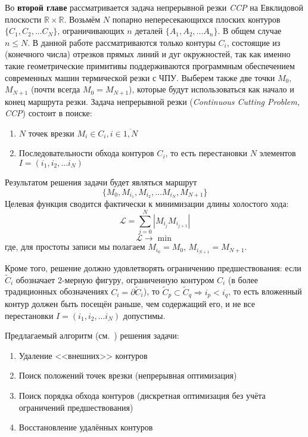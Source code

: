 
Во {\bf второй главе} 
рассматривается задача непрерывной резки {\it CCP}
на Евклидовой плоскости
$\mathbb R \times \mathbb R$.
Возьмём
$N$
попарно непересекающихся плоских контуров
$\{C_1, C_2, ... C_N\}$,
ограничивающих
$n$
деталей
$\{A_1, A_2, ... A_n\}$.
В общем случае
$n \leqslant N$.
В данной работе рассматриваются только контуры 
$C_i$,
состоящие из
(конечного числа)
отрезков прямых линий и дуг окружностей,
так как именно такие геометрические примитивы
поддерживаются программным обеспечением
современных машин термической резки с ЧПУ.
Выберем также две точки 
$M_0$, $M_{N + 1}$
(почти всегда $M_0 = M_{N + 1}$),
которые будут использоваться
как начало и конец
маршрута резки.
Задача непрерывной резки
({\it Continuous Cutting Problem, CCP})
состоит в поиске:
\begin{enumerate}
\item
$N$ точек врезки $M_i \in C_i, i \in \overline{1, N}$
\item
Последовательности обхода контуров
$C_i$,
то есть перестановки
$N$
элементов
$I = (i_1, i_2, ... i_N)$
\end{enumerate}
Результатом решения задачи будет являться маршрут
\begin{equation}
  \label{eq:route}
  \{M_0, M_{i_1}, M_{i_2}, \dots M_{i_N}, M_{N + 1}\}
\end{equation}
Целевая функция
сводится фактически к минимизации длины холостого хода:
\begin{equation}
  \mathcal{L} = \sum_{j=0}^N|M_{i_j}M_{i_{j+1}}|
  \label{air-move-length}
\end{equation}
$$
\mathcal{L} \to \min
$$
где, для простоты записи мы полагаем
$M_{i_0} = M_0$,
$M_{i_{N + 1}} = M_{N + 1}$.

Кроме того, решение должно удовлетворять ограничению предшествования:
если
$\widetilde C_i$
обозначает 2-мерную фигуру,
ограниченную контуром
$C_i$
(в более традиционных обозначениях
$C_i = \partial \widetilde C_i$),
то 
$
 \widetilde C_p \subset \widetilde C_q \Rightarrow i_p < i_q 
$,
то есть вложенный контур должен быть посещён раньше,
чем содержащий его,
и не все перестановки
$I = (i_1, i_2, ... i_N)$
допустимы.

Предлагаемый алгоритм
(см.~\cite{berlin2019})
решения задачи:

\begin{enumerate}
  \item Удаление <<внешних>> контуров
  \item Поиск положений точек врезки (непрерывная оптимизация)
  \item Поиск порядка обхода контуров (дискретная оптимизация без учёта ограничений предшествования)
  \item Восстановление удалённых контуров
\end{enumerate}

